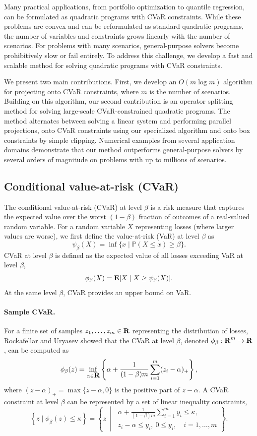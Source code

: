 \documentclass[12pt]{article}
\begin{document}
Many practical applications, from portfolio optimization to quantile regression,
can be formulated as quadratic programs with CVaR constraints. While these
problems are convex and can be reformulated as standard quadratic programs, the
number of variables and constraints grows linearly with the number of scenarios.
For problems with many scenarios, general-purpose solvers become prohibitively
slow or fail entirely. To address this challenge, we develop a fast and scalable
method for solving quadratic programs with CVaR constraints.

We present two main contributions. First, we develop an $O(m\log m)$ algorithm
for projecting onto CVaR constraints, where $m$ is the number of scenarios.
Building on this algorithm, our second contribution is an operator splitting
method for solving large-scale CVaR-constrained quadratic programs. The method
alternates between solving a linear system and performing parallel projections,
onto CVaR constraints using our specialized algorithm and onto box constraints
by simple clipping. Numerical examples from
several application domains demonstrate that our method outperforms
general-purpose solvers by several orders of magnitude on problems with up to
millions of scenarios.

\subsection{Conditional value-at-risk (CVaR)}
The conditional value-at-risk (CVaR) at level $\beta$ is a risk measure that
captures the expected value over the worst $(1-\beta)$ fraction of outcomes of a
real-valued random variable. For a random variable $X$ representing losses
(where larger values are worse), we first define the value-at-risk (VaR) at
level $\beta$ as
\[
    \psi_\beta(X) = \inf\{x\mid \mathbb{P}(X\leq x) \geq \beta\}.
\]
CVaR at level $\beta$ is defined as the expected value of all losses exceeding
VaR at level $\beta$, 
\[
    \phi_\beta(X) = \mathop{\bf E{}}[X\mid X\geq \psi_\beta(X)].
\]
At the same level $\beta$, CVaR provides an upper bound on VaR.

\paragraph{Sample CVaR.}
For a finite set of samples $z_1,\ldots, z_m\in{\mbox{\bf R}}$ representing the distribution
of losses, Rockafellar and Uryasev \cite{rockafellar2000optimization} showed that
the CVaR at level $\beta$, denoted $\phi_\beta:{\mbox{\bf R}}^m \to {\mbox{\bf R}}$, can be
computed as
\[
    \phi_\beta(z) = \inf_{\alpha \in {\mbox{\bf R}}} \left\{ \alpha + \frac{1}{(1-\beta)m}\sum_{i=1}^m(z_i-\alpha)_+ \right\},
\]
where $(z-\alpha)_+ = \max\{z-\alpha, 0\}$ is the positive part of $z-\alpha$. 
A CVaR constraint at level $\beta$ can be represented by a set of linear
inequality constraints,
\[
    \left\{z\mid \phi_\beta(z) \leq \kappa\right\} = \left\{z ~\middle|~ 
    \begin{array}{l}\alpha + \frac{1}{(1-\beta)m}\sum_{i=1}^m y_i \leq \kappa,\\
    z_i - \alpha \leq y_i,~0 \leq y_i, \quad i = 1,\ldots, m
    \end{array}
    \right\}.
\]
\end{document}
